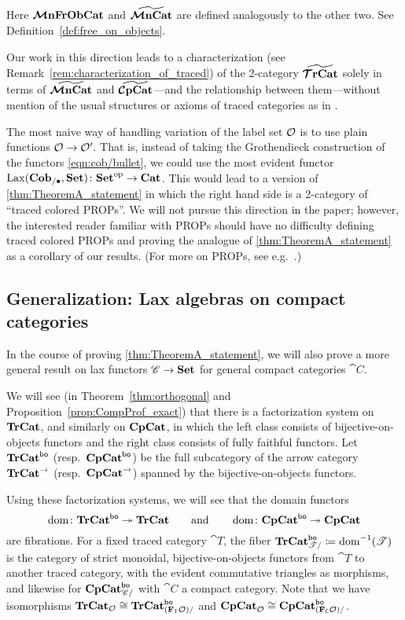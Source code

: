 \documentclass[11pt,oneside,article]{memoir}
\begin{document}
Here $\bm{\mathcal{M}}\mathbf{nFrObCat}$ and $\widetilde{\bm{\mathcal{M}}\mathbf{nCat}}$ are defined analogously to the other two. See
Definition~\ref{def:free_on_objects}.

Our work in this direction leads to a characterization (see
Remark~\ref{rem:characterization_of_traced}) of the 2-category $\widetilde{\bm{\mathcal{T}}\mathbf{rCat}}$ solely in terms of
$\widetilde{\bm{\mathcal{M}}\mathbf{nCat}}$ and $\widetilde{\bm{\mathcal{C}}\mathbf{pCat}}$---and the relationship between them---without mention of the
usual structures or axioms of traced categories as in \cite{JoyalStreetVerity}.

\begin{remark}
   The most naive way of handling variation of the label set $\mathcal{O}$ is to use plain functions
   $\mathcal{O}\to\mathcal{O}'$. That is, instead of taking the Grothendieck construction of the functors
   \eqref{eqn:cob/bullet}, we could use the most evident functor
   $\operatorname{Lax}(\mathbf{Cob}_{/\bullet},\mathbf{Set})\colon{\mathbf{Set}}^{\text{op}}\to\mathbf{Cat}$. This would lead to a version of
   \ref{thm:TheoremA_statement} in which the right hand side is a 2-category of ``traced colored
   PROPs''. We will not pursue this direction in the paper; however, the interested reader familiar
   with PROPs should have no difficulty defining traced colored PROPs and proving the analogue of
   \ref{thm:TheoremA_statement} as a corollary of our results. (For more on PROPs, see
   e.g.~\cite{HackneyRobertson}.)
\end{remark}

\subsection{Generalization: Lax algebras on compact categories}

In the course of proving \ref{thm:TheoremA_statement}, we will also prove a more general result
on lax functors $\mathscr{C}\to\mathbf{Set}$ for general compact categories $\cat{C}$.

We will see (in Theorem~\ref{thm:orthogonal} and Proposition~\ref{prop:CompProf_exact}) that there
is a factorization system on $\mathbf{TrCat}$, and similarly on $\mathbf{CpCat}$, in which the left class consists
of bijective-on-objects functors and the right class consists of fully faithful functors. Let
$\mathbf{TrCat}^{\mathsf{bo}}$ (resp.\ $\mathbf{CpCat}^{\mathsf{bo}}$) be the full subcategory of the arrow category $\mathbf{TrCat}^{\to}$
(resp.\ $\mathbf{CpCat}^{\to}$) spanned by the bijective-on-objects functors.

Using these factorization systems, we will see that the domain functors
\[
   \operatorname{dom}\colon\mathbf{TrCat}^{\mathsf{bo}}\twoheadrightarrow\mathbf{TrCat}
   \qquad\text{and}\qquad
   \operatorname{dom}\colon\mathbf{CpCat}^{\mathsf{bo}}\twoheadrightarrow\mathbf{CpCat}
\]
are fibrations. For a fixed traced category $\cat{T}$, the fiber
$\mathbf{TrCat}^{\mathsf{bo}}_{\mathscr{T}/}\coloneqq\operatorname{dom}^{-1}(\mathscr{T})$ is the category of strict monoidal,
bijective-on-objects functors from $\cat{T}$ to another traced category, with the evident
commutative triangles as morphisms, and likewise for $\mathbf{CpCat}^{\mathsf{bo}}_{\mathscr{C}/}$ with $\cat{C}$ a
compact category. Note that we have isomorphisms $\mathbf{TrCat}_{\mathcal{O}}\cong\mathbf{TrCat}^{\mathsf{bo}}_{(\mathbf{F}_{\mathsf{T}}\mathcal{O})/}$
and $\mathbf{CpCat}_{\mathcal{O}}\cong\mathbf{CpCat}^{\mathsf{bo}}_{(\mathbf{F}_{\mathsf{C}}\mathcal{O})/}$.
\end{document}
